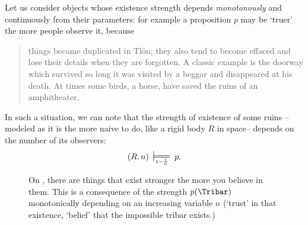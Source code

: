 \begin{example}\label{blu}
  Let us consider objects whose existence strength depends \emph{monotonously} and continuously from their parameters: for example a proposition $p$ may be `truer' the more people observe it, because
  \begin{quote}
    things became duplicated in Tlön; they also tend to become effaced and lose their details when they are forgotten. A classic example is the doorway which survived so long it was visited by a beggar and disappeared at his death. At times some birds, a horse, have saved the ruins of an amphitheater.  \hfill\cite{tlonEN}
  \end{quote}
  In such a situation, we can note that the strength of existence of some ruins --modeled as it is the more naive to do, like a rigid body $R$ in space-- depends on the number of its observers:
  \[(R,n)\entails{1-\frac{1}{n}} p.\]%
  \begin{figure}[h]
    \begin{center}
    \end{center}
    \caption{On \tlon, there are things that exist stronger the more you believe in them. This is a consequence of the strength $p(\Tribar)$ monotonically depending on an increasing variable $n$ (`trust' in that existence, `belief' that the impossible tribar \Tribar exists.)}
  \end{figure}
\end{example}
